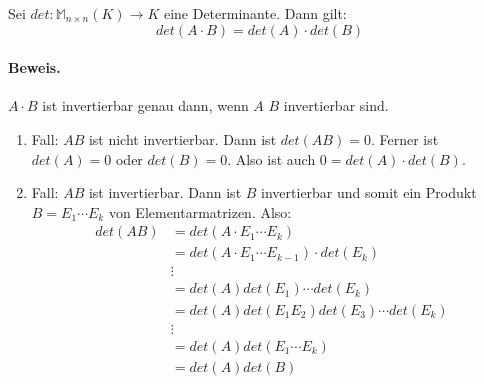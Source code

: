 \documentclass[9pt]{article} %
\begin{document}
\begin{prop}
Sei \(det: \mathbb{M}_{n \times n} (K) \rightarrow K \) eine Determinante. Dann gilt: 
\[det(A\cdot B) = det (A) \cdot det(B)\]
\paragraph{Beweis.} $A \cdot B$ ist invertierbar genau dann, wenn $A$  $B$ invertierbar sind. 
\begin{enumerate}
    \item  Fall: $AB$ ist nicht invertierbar. Dann ist $det(AB)=0$. Ferner ist $det(A)=0$ oder $det(B) =0$. Also ist auch $0 = det(A) \cdot det(B)$. 
    \item Fall: $AB$ ist invertierbar. Dann ist $B$ invertierbar und somit ein Produkt $B = E_1 \cdots E_k$ von Elementarmatrizen. Also:
    \begin{align*}
        det(AB) &= det(A \cdot E_1 \cdots E_k ) \\
        &= det(A \cdot E_1 \cdots E_{k-1}) \cdot det(E_k) \\
        & \vdots \\
        &= det(A)det(E_1) \cdots det(E_k) \\
        &= det(A)det(E_1 E_2) det(E_3) \cdots det(E_k) \\
        & \vdots \\
        &= det(A) det(E_1 \cdots E_k ) \\
        &= det(A) det(B)
    \end{align*}
\end{enumerate}
\end{prop}
\end{document}
